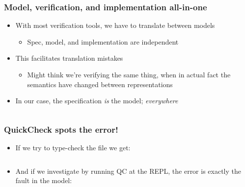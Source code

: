 \documentclass[compress,handout]{beamer}
\begin{document}
\begin{frame}[fragile]
  \frametitle{Model, verification, and implementation all-in-one}

  \begin{itemize}
    \item<1-> With most verification tools, we have to translate between models
    \begin{itemize}
      \item<1-> Spec, model, and implementation are independent
    \end{itemize}
    \item<2-> This facilitates translation mistakes
    \begin{itemize}
      \item<2-> Might think we're verifying the same thing, when in actual fact
                the semantics have changed between representations
    \end{itemize}
    \item<3-> In our case, the specification \textit{is} the model;
              \textit{everywhere}
              \vspace*{1mm}
              \inputminted[fontsize=\footnotesize]{Idris}{qc-things/ATM-arb-trace.idr}
  \end{itemize}

\end{frame}


\begin{frame}
  \frametitle{QuickCheck spots the error!}

  \begin{itemize}
    \item<1-> If we try to type-check the file we get:
              \vspace*{1mm}
              \inputminted[fontsize=\scriptsize]{Idris}{qc-things/ATM-qc-error.idr}
    \item<2-> And if we investigate by running QC at the REPL, the error is
              exactly the fault in the model:
              \vspace*{1mm}
              \inputminted[fontsize=\scriptsize]{Idris}{qc-things/qc-trace-4.idr}
              \vspace*{-4mm}
  \end{itemize}

\end{frame}
\end{document}
